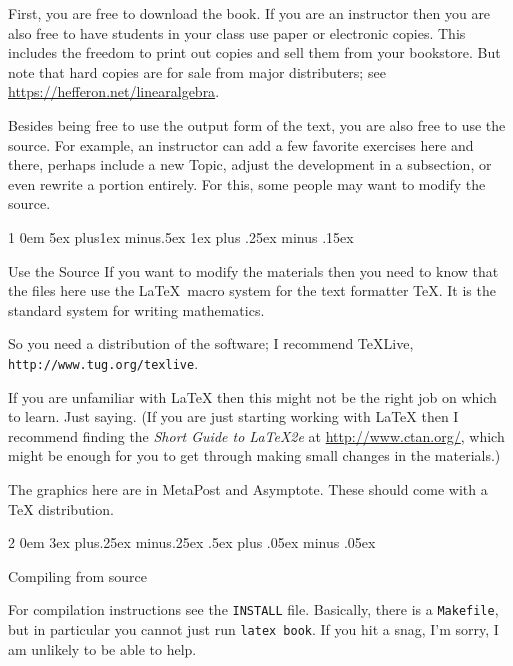 \documentclass[titlepage]{article}
\makeatletter
\renewcommand{\section}{\@startsection{section}%
  {1}%
  {0em}%
  {5ex plus1ex minus.5ex}%
  {1ex plus .25ex minus .15ex}%
  {\large\bfseries\raggedright}}
\renewcommand{\subsection}{\@startsection{subsection}%
  {2}%
  {0em}%
  {3ex plus.25ex minus.25ex}%
  {.5ex plus .05ex minus .05ex}%
  {\bfseries\raggedright}}
\makeatother
\begin{document}
First, you are free to download the book.
If you are an
instructor then you are also free to have students in your class 
use paper or electronic copies. 
This includes the freedom to print out copies and sell them
from your bookstore.
But note that hard copies are for sale from major distributers; 
see \url{https://hefferon.net/linearalgebra}.

Besides being free to use the output form of the text, you are
also free to use the source.
For example, 
an instructor can add a few favorite exercises 
here and there, perhaps include a new Topic, adjust the development
in a subsection, or even rewrite a portion entirely.
For this, some people may want to modify the source.



\section{Use the Source}
If you want to modify the materials then 
you need to know that the files here
use the \LaTeX\ macro system for the text formatter \TeX. 
It is the 
standard system for writing mathematics.

So you need a
distribution of the software;
I recommend \TeX{}Live, \texttt{http://www.tug.org/texlive}. 

If you are unfamiliar with \LaTeX{} then
this might not be the right job on which to learn.
Just saying.
(If you are just starting working with \LaTeX{} then I recommend finding the 
\textit{Short Guide to \LaTeX2e} at
\url{http://www.ctan.org/}, which might be enough
for you to get through making small changes in the materials.)

The graphics here are in MetaPost and Asymptote.
These should come with a \TeX{} distribution.




\subsection{Compiling from source}

For compilation instructions see the \verb!INSTALL! file.
Basically, there is a \texttt{Makefile}, but in particular 
you cannot just run \texttt{latex book}.
If you hit a snag, I'm sorry, I am unlikely to be able to help.
\end{document}
